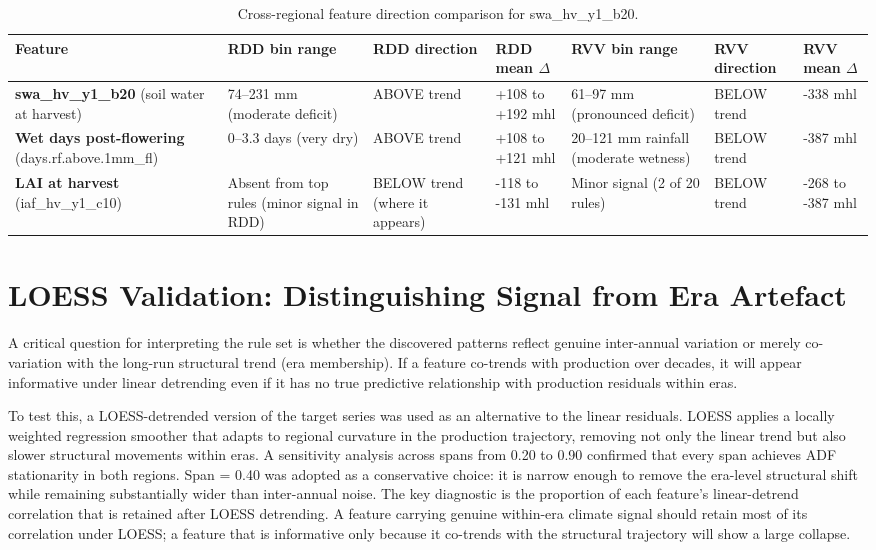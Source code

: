 \begin{table}[htbp]
  \centering
  \caption{Cross-regional feature direction comparison for swa\_hv\_y1\_b20.}\label{tab:ch4a_3}
  \small
  \setlength{\tabcolsep}{4pt}
  \begin{adjustbox}{max width=\textwidth}
    \begin{tabularx}{\textwidth}{p{2.2cm}|p{2.2cm}|p{1.4cm}|p{1.6cm}|p{2.2cm}|p{1.4cm}|X}
  \toprule
  Feature & RDD bin range & RDD direction & RDD mean $\Delta$ & RVV bin range & RVV direction & RVV mean $\Delta$ \\
  \midrule
  \textbf{swa\_hv\_y1\_b20}
(soil water at harvest) & 74--231 mm
(moderate deficit) & ABOVE trend & +108 to +192 mhl & 61--97 mm
(pronounced deficit) & BELOW trend & -338 mhl \\
  \textbf{Wet days post-flowering}
(days.rf.above.1mm\_fl) & 0--3.3 days
(very dry) & ABOVE trend & +108 to +121 mhl & 20--121 mm rainfall
(moderate wetness) & BELOW trend & -387 mhl \\
  \textbf{LAI at harvest}
(iaf\_hv\_y1\_c10) & Absent from top rules
(minor signal in RDD) & BELOW trend
(where it appears) & -118 to -131 mhl & Minor signal
(2 of 20 rules) & BELOW trend & -268 to -387 mhl \\
  \bottomrule
\end{tabularx}
  \end{adjustbox}

\end{table}



\section{LOESS Validation: Distinguishing Signal from Era Artefact}\label{sec:loess_validation_distinguishing_signal}

A critical question for interpreting the rule set is whether the discovered patterns reflect genuine inter-annual variation or merely co-variation with the long-run structural trend (era membership). If a feature co-trends with production over decades, it will appear informative under linear detrending even if it has no true predictive relationship with production residuals within eras.

To test this, a LOESS-detrended version of the target series was used as an alternative to the linear residuals. LOESS applies a locally weighted regression smoother that adapts to regional curvature in the production trajectory, removing not only the linear trend but also slower structural movements within eras. A sensitivity analysis across spans from 0.20 to 0.90 confirmed that every span achieves ADF stationarity in both regions. Span = 0.40 was adopted as a conservative choice: it is narrow enough to remove the era-level structural shift while remaining substantially wider than inter-annual noise. The key diagnostic is the proportion of each feature's linear-detrend correlation that is retained after LOESS detrending. A feature carrying genuine within-era climate signal should retain most of its correlation under LOESS; a feature that is informative only because it co-trends with the structural trajectory will show a large collapse.

